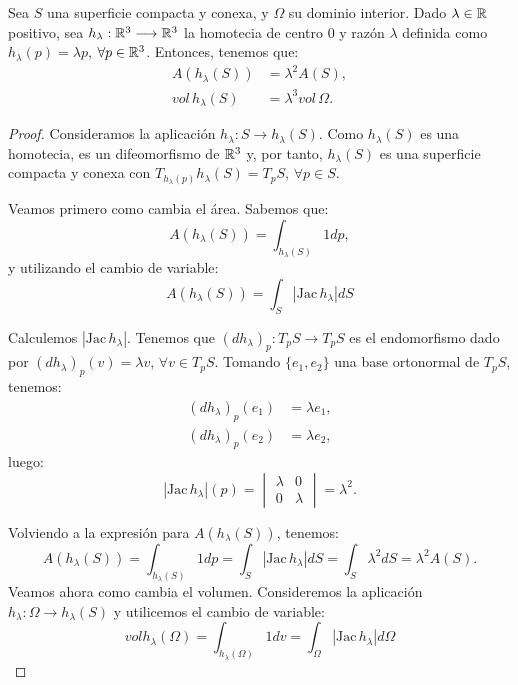 \begin{lemma}
Sea $S$ una superficie compacta y conexa, y $\Omega$ su dominio interior. Dado $\lambda \in \mathbb{R}$ positivo, sea $h_\lambda: \mathbb{R}^3 \longrightarrow \mathbb{R}^3$ la homotecia de centro $0$ y razón $\lambda$ definida como $h_\lambda(p)=\lambda p$, $\forall p \in \mathbb{R}^3$. Entonces, tenemos que:
%
\begin{align*}
    A(h_\lambda(S)) &= \lambda^2A(S), \\
    vol \, h_\lambda(S) &= \lambda^3 vol \, \Omega.
\end{align*}
\end{lemma}
\begin{proof}
Consideramos la aplicación $h_\lambda: S \longrightarrow h_\lambda(S)$. Como $h_\lambda(S)$ es una homotecia, es un difeomorfismo de $\mathbb{R}^3$ y, por tanto, $h_\lambda(S)$ es una superficie compacta y conexa con $T_{h_\lambda (p)} h_\lambda (S) = T_pS$, $\forall p \in S$.

Veamos primero como cambia el área. Sabemos que:
%
\begin{equation*}
    A(h_\lambda(S)) = \int_{h_\lambda(S)} 1dp,
\end{equation*}
%
y utilizando el cambio de variable:
%
\begin{equation*}
    A(h_\lambda(S)) = \int_{S} |\text{Jac} \, h_\lambda| dS
\end{equation*}

Calculemos $|\text{Jac} \, h_\lambda|$. Tenemos que $(dh_\lambda)_p: T_pS \longrightarrow T_pS$ es el endomorfismo dado por $(dh_\lambda)_p(v) = \lambda v$, $\forall v \in T_pS$. Tomando $\{e_1, e_2\}$ una base ortonormal de $T_pS$, tenemos:
%
\begin{align*}
    (dh_\lambda)_p(e_1) &= \lambda e_1, \\
    (dh_\lambda)_p(e_2) &= \lambda e_2,
\end{align*}
%
luego: 
%
\begin{equation*}
|\text{Jac} \, h_\lambda|(p) = \begin{vmatrix}
\lambda & 0 \\ 
0 & \lambda
\end{vmatrix} = \lambda^2.
\end{equation*}

Volviendo a la expresión para $A(h_\lambda(S))$, tenemos:
%
\begin{equation*}
    A(h_\lambda(S)) = \int_{h_\lambda(S)} 1dp = \int_{S} |\text{Jac} \, h_\lambda| dS = \int_{S} \lambda^2dS = \lambda^2A(S).
\end{equation*}
%
Veamos ahora como cambia el volumen. Consideremos la aplicación $h_\lambda: \Omega \longrightarrow h_\lambda(S)$ y utilicemos el cambio de variable:
%
\begin{equation*}
    vol h_\lambda(\Omega) = \int_{h_\lambda(\Omega)} 1dv = \int_{\Omega} |\text{Jac} \, h_\lambda| d\Omega
\end{equation*}


\end{proof}
